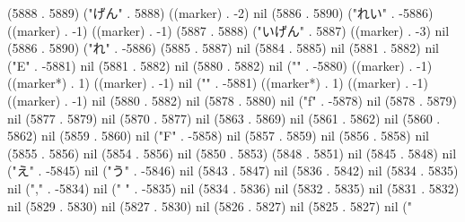 (5888 . 5889) ("げん" . 5888) ((marker) . -2) nil (5886 . 5890) ("れい" . -5886) ((marker) . -1) ((marker) . -1) (5887 . 5888) ("いげん" . 5887) ((marker) . -3) nil (5886 . 5890) ("れ" . -5886) (5885 . 5887) nil (5884 . 5885) nil (5881 . 5882) nil ("E" . -5881) nil (5881 . 5882) nil (5880 . 5882) nil ("{" . -5880) ((marker) . -1) ((marker*) . 1) ((marker) . -1) nil ("}" . -5881) ((marker*) . 1) ((marker) . -1) ((marker) . -1) nil (5880 . 5882) nil (5878 . 5880) nil ("f" . -5878) nil (5878 . 5879) nil (5877 . 5879) nil (5870 . 5877) nil (5863 . 5869) nil (5861 . 5862) nil (5860 . 5862) nil (5859 . 5860) nil ("F" . -5858) nil (5857 . 5859) nil (5856 . 5858) nil (5855 . 5856) nil (5854 . 5856) nil (5850 . 5853) (5848 . 5851) nil (5845 . 5848) nil ("え" . -5845) nil ("う" . -5846) nil (5843 . 5847) nil (5836 . 5842) nil (5834 . 5835) nil ("," . -5834) nil (" " . -5835) nil (5834 . 5836) nil (5832 . 5835) nil (5831 . 5832) nil (5829 . 5830) nil (5827 . 5830) nil (5826 . 5827) nil (5825 . 5827) nil ("
